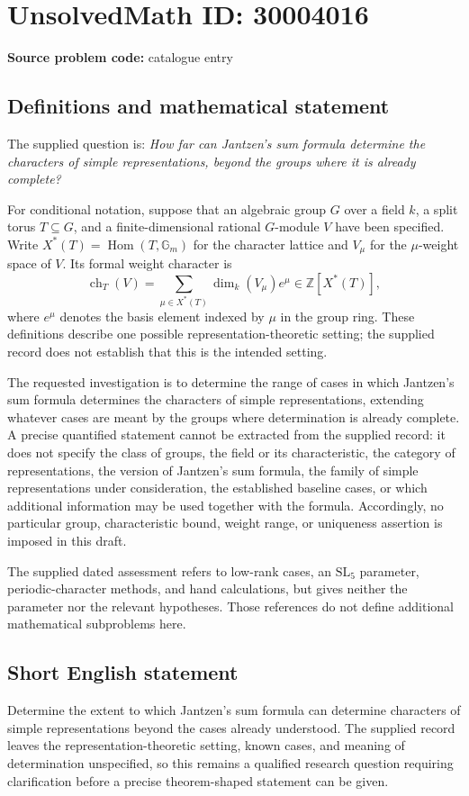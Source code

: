 \documentclass[11pt]{article}
\begin{document}
\section*{UnsolvedMath ID: 30004016}
\textbf{Source problem code:} catalogue entry
\subsection{Definitions and mathematical statement}
The supplied question is: \emph{How far can Jantzen's sum formula determine the characters of simple representations, beyond the groups where it is already complete?}

For conditional notation, suppose that an algebraic group \(G\) over a field \(k\), a split torus \(T\subseteq G\), and a finite-dimensional rational \(G\)-module \(V\) have been specified. Write \(X^*(T)=\operatorname{Hom}(T,\mathbb G_m)\) for the character lattice and \(V_\mu\) for the \(\mu\)-weight space of \(V\). Its formal weight character is
\[
\operatorname{ch}_T(V)=\sum_{\mu\in X^*(T)}\dim_k(V_\mu)e^\mu\in\mathbb Z[X^*(T)],
\]
where \(e^\mu\) denotes the basis element indexed by \(\mu\) in the group ring. These definitions describe one possible representation-theoretic setting; the supplied record does not establish that this is the intended setting.

The requested investigation is to determine the range of cases in which Jantzen's sum formula determines the characters of simple representations, extending whatever cases are meant by the groups where determination is already complete. A precise quantified statement cannot be extracted from the supplied record: it does not specify the class of groups, the field or its characteristic, the category of representations, the version of Jantzen's sum formula, the family of simple representations under consideration, the established baseline cases, or which additional information may be used together with the formula. Accordingly, no particular group, characteristic bound, weight range, or uniqueness assertion is imposed in this draft.

The supplied dated assessment refers to low-rank cases, an \(\mathrm{SL}_5\) parameter, periodic-character methods, and hand calculations, but gives neither the parameter nor the relevant hypotheses. Those references do not define additional mathematical subproblems here.
\subsection{Short English statement}
Determine the extent to which Jantzen's sum formula can determine characters of simple representations beyond the cases already understood. The supplied record leaves the representation-theoretic setting, known cases, and meaning of determination unspecified, so this remains a qualified research question requiring clarification before a precise theorem-shaped statement can be given.
\end{document}
